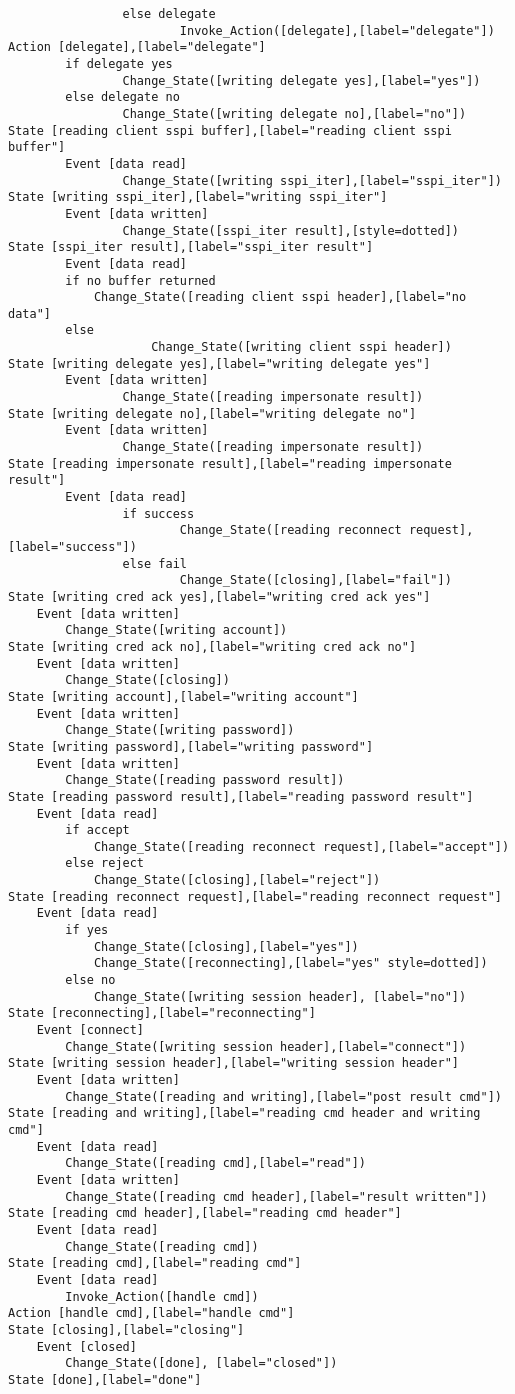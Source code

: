 \begin{verbatim}
                else delegate
                        Invoke_Action([delegate],[label="delegate"])
Action [delegate],[label="delegate"]
        if delegate yes
                Change_State([writing delegate yes],[label="yes"])
        else delegate no
                Change_State([writing delegate no],[label="no"])
State [reading client sspi buffer],[label="reading client sspi buffer"]
        Event [data read]
                Change_State([writing sspi_iter],[label="sspi_iter"])
State [writing sspi_iter],[label="writing sspi_iter"]
        Event [data written]
                Change_State([sspi_iter result],[style=dotted])
State [sspi_iter result],[label="sspi_iter result"]
        Event [data read]
		if no buffer returned
			Change_State([reading client sspi header],[label="no data"]
		else
	                Change_State([writing client sspi header])
State [writing delegate yes],[label="writing delegate yes"]
        Event [data written]
                Change_State([reading impersonate result])
State [writing delegate no],[label="writing delegate no"]
        Event [data written]
                Change_State([reading impersonate result])
State [reading impersonate result],[label="reading impersonate result"]
        Event [data read]
                if success
                        Change_State([reading reconnect request],[label="success"])
                else fail
                        Change_State([closing],[label="fail"])
State [writing cred ack yes],[label="writing cred ack yes"]
	Event [data written]
		Change_State([writing account])
State [writing cred ack no],[label="writing cred ack no"]
	Event [data written]
		Change_State([closing])
State [writing account],[label="writing account"]
	Event [data written]
		Change_State([writing password])
State [writing password],[label="writing password"]
	Event [data written]
		Change_State([reading password result])
State [reading password result],[label="reading password result"]
	Event [data read]
		if accept
			Change_State([reading reconnect request],[label="accept"])
		else reject
			Change_State([closing],[label="reject"])
State [reading reconnect request],[label="reading reconnect request"]
	Event [data read]
		if yes
			Change_State([closing],[label="yes"])
			Change_State([reconnecting],[label="yes" style=dotted])
		else no
			Change_State([writing session header], [label="no"])
State [reconnecting],[label="reconnecting"]
	Event [connect]
		Change_State([writing session header],[label="connect"])
State [writing session header],[label="writing session header"]
	Event [data written]
		Change_State([reading and writing],[label="post result cmd"])
State [reading and writing],[label="reading cmd header and writing cmd"]
	Event [data read]
		Change_State([reading cmd],[label="read"])
	Event [data written]
		Change_State([reading cmd header],[label="result written"])
State [reading cmd header],[label="reading cmd header"]
	Event [data read]
		Change_State([reading cmd])
State [reading cmd],[label="reading cmd"]
	Event [data read]
		Invoke_Action([handle cmd])
Action [handle cmd],[label="handle cmd"]
State [closing],[label="closing"]
	Event [closed]
		Change_State([done], [label="closed"])
State [done],[label="done"]
\end{verbatim}
